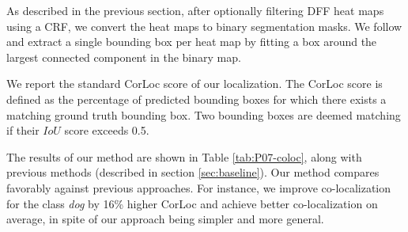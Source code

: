 \documentclass[runningheads]{llncs}
\begin{document}
	As described in the previous section, after optionally filtering DFF heat maps using a CRF, we convert the heat maps to binary segmentation masks. We follow \cite{selvaraju2016grad} and extract a single bounding box per heat map by fitting a box around the largest connected component in the binary map. 
	
	We report the standard CorLoc score \cite{deselaers2012weakly} of our localization. The CorLoc score is defined as the percentage of predicted bounding boxes for which there exists a matching ground truth bounding box. Two bounding boxes are deemed matching if their $IoU$ score exceeds 0.5.
	
	The results of our method are shown in Table \ref{tab:P07-coloc}, along with previous methods (described in section \ref{sec:baseline}). Our method compares favorably against previous approaches. For instance, we improve co-localization for the class \emph{dog} by 16\% higher CorLoc and achieve better co-localization on average, in spite of our approach being simpler and more general.
	
\end{document}
